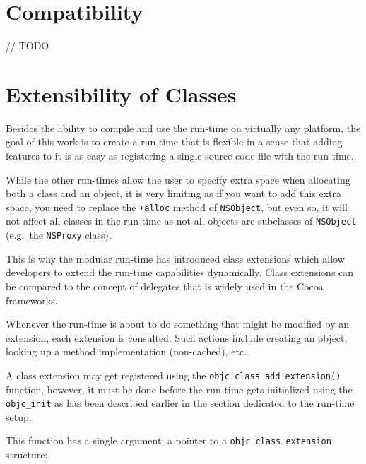  

\section{Compatibility}

// TODO

\section{Extensibility of Classes}

Besides the ability to compile and use the run-time on virtually any platform, the goal of this work is to create a run-time that is flexible in a sense that adding features to it is as easy as registering a single source code file with the run-time.

While the other run-times allow the user to specify extra space when allocating both a class and an object, it is very limiting as if you want to add this extra space, you need to replace the \verb=+alloc= method of \verb=NSObject=, but even so, it will not affect all classes in the run-time as not all objects are subclasses of \verb=NSObject= (e.g.\ the \verb=NSProxy= class).

This is why the modular run-time has introduced class extensions which allow developers to extend the run-time capabilities dynamically. Class extensions can be compared to the concept of delegates that is widely used in the Cocoa frameworks. 

Whenever the run-time is about to do something that might be modified by an extension, each extension is consulted. Such actions include creating an object, looking up a method implementation (non-cached), etc.

A class extension may get registered using the \verb=objc_class_add_extension()= function, however, it must be done before the run-time gets initialized using the \verb=objc_init= as has been described earlier in the section dedicated to the run-time setup.

This function has a single argument: a pointer to a \verb=objc_class_extension= structure:

